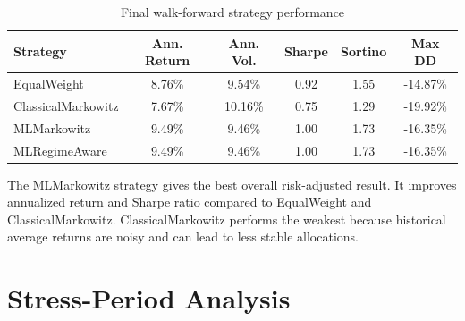 \documentclass[11pt,a4paper]{article}
\begin{document}
\begin{table}[H]
\centering
\caption{Final walk-forward strategy performance}
\begin{tabular}{lccccc}
\toprule
\textbf{Strategy} & \textbf{Ann. Return} & \textbf{Ann. Vol.} & \textbf{Sharpe} & \textbf{Sortino} & \textbf{Max DD} \\
\midrule
EqualWeight & 8.76\% & 9.54\% & 0.92 & 1.55 & -14.87\% \\
ClassicalMarkowitz & 7.67\% & 10.16\% & 0.75 & 1.29 & -19.92\% \\
MLMarkowitz & 9.49\% & 9.46\% & 1.00 & 1.73 & -16.35\% \\
MLRegimeAware & 9.49\% & 9.46\% & 1.00 & 1.73 & -16.35\% \\
\bottomrule
\end{tabular}
\end{table}

The MLMarkowitz strategy gives the best overall risk-adjusted result. It improves annualized return and Sharpe ratio compared to EqualWeight and ClassicalMarkowitz. ClassicalMarkowitz performs the weakest because historical average returns are noisy and can lead to less stable allocations.

\section{Stress-Period Analysis}

\begin{table}[H]
\centering
\caption{Stress-period total returns}
\end{table}
\end{document}
